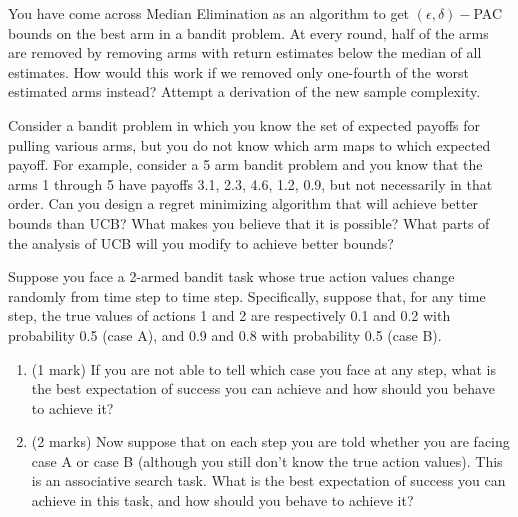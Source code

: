 \documentclass[addpoints,12pt,solution]{exam}
\begin{document}
\begin{questions}
\question[2] You have come across Median Elimination as an algorithm to get $(\epsilon, \delta)-$PAC bounds on the best arm in a bandit problem. At every round, half
of the arms are removed by removing arms with return estimates below
the median of all estimates. How would this work if we removed only
one-fourth of the worst estimated arms instead? Attempt a derivation of
the new sample complexity.

\begin{solution}
\end{solution}

\question[3] Consider a bandit problem in which you know the set of expected payoffs for pulling various arms, but you do not know which arm maps to which expected payoff. For example, consider a 5 arm bandit problem and you know that the arms 1 through 5 have payoffs 3.1, 2.3, 4.6, 1.2, 0.9, but not necessarily in that order. Can you design a regret minimizing algorithm that will achieve better bounds than UCB? What makes you believe that it is possible? What parts of the analysis of UCB will you modify to achieve better bounds?
\begin{solution}
\end{solution}

\question[3]Suppose you face a 2-armed bandit task whose true action values change randomly from time step to time step. Specifically, suppose that, for any time step, the true values of actions 1 and 2 are respectively 0.1 and 0.2 with probability 0.5 (case A), and 0.9 and 0.8 with probability 0.5 (case B). 

\begin{enumerate}[label=(\alph*)]
    \item (1 mark) If you are not able to tell which case you face at any step, what is the best expectation of success you can achieve and how should you behave to achieve it?
\begin{solution}
\end{solution}
    
    \item (2 marks) Now suppose that on each step you are told whether you are facing case A or case B (although you still don’t know the true action values). This is an associative search task. What is the best expectation of success you can achieve in this task, and how should you behave to achieve it?
\begin{solution}
\end{solution}
\end{enumerate}
 





\end{questions}
\end{document}
